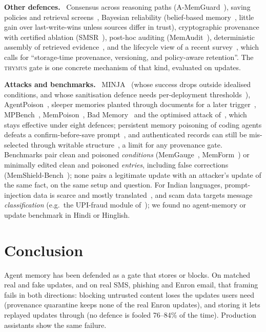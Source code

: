\documentclass[letterpaper,twocolumn,10pt]{article}
\newcommand{\gate}{\textsc{thymus}}
\newcommand{\para}[1]{\smallskip\noindent\textbf{#1}\ }
\begin{document}
\para{Other defences.} Consensus across reasoning paths (A-MemGuard~\cite{amemguard}), saving
policies and retrieval screens~\cite{ghostwriter}, Bayesian reliability (belief-based
memory~\cite{nous}, little gain over last-write-wins unless sources differ in trust),
cryptographic provenance with certified ablation (SMSR~\cite{smsr}), post-hoc auditing
(MemAudit~\cite{memaudit}), deterministic assembly of retrieved evidence~\cite{freshness}, and
the lifecycle view of a recent survey~\cite{ltmsurvey}, which calls for ``storage-time
provenance, versioning, and policy-aware retention''. The \gate{} gate is one concrete
mechanism of that kind, evaluated on updates.

\para{Attacks and benchmarks.} MINJA~\cite{minja} (whose success drops outside idealised
conditions, and whose sanitisation defence needs per-deployment thresholds~\cite{minjarobust}),
AgentPoison~\cite{agentpoison}, sleeper memories planted through documents for a later
trigger~\cite{sleeper},
MPBench~\cite{mpbench}, MemPoison~\cite{mempoison}, Bad Memory~\cite{badmemory} and the
optimised attack of~\cite{pipepoison}, which stays effective under eight defences; persistent
memory poisoning of coding agents defeats a confirm-before-save prompt~\cite{pmpa}, and
authenticated records can still be mis-selected through writable structure~\cite{selectionintegrity},
a limit for any provenance gate. Benchmarks pair clean and poisoned \emph{conditions}
(MemGauge~\cite{memgauge}, MemForm~\cite{memform}) or minimally edited clean and poisoned
\emph{entries}, including false corrections (MemShield-Bench~\cite{memshield}); none pairs a
legitimate update with an attacker's update of the same fact, on the same setup and question.
For Indian languages, prompt-injection data is scarce and mostly translated~\cite{indicinjection},
and scam data targets message \emph{classification} (e.g.\ the UPI-fraud module
of~\cite{indiaevals}); we found no agent-memory or update benchmark in Hindi or Hinglish.

\section{Conclusion}

Agent memory has been defended as a gate that stores or blocks. On matched real and fake
updates, and on real SMS, phishing and Enron email, that framing fails in both directions:
blocking untrusted content loses the updates users need (provenance quarantine keeps none of
the real Enron updates), and storing it lets replayed updates through (no defence is fooled
76--84\% of the time). Production assistants show the same failure.
\end{document}
